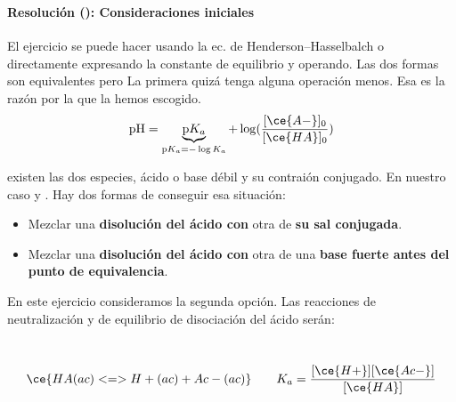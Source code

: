 \begin{frame}
	\frametitle{\ejerciciocmd}
	\framesubtitle{Resolución (): Consideraciones iniciales}
	El ejercicio se puede hacer usando la ec. de Henderson--Hasselbalch o directamente expresando la constante de equilibrio y operando. Las dos formas son equivalentes pero La primera quizá tenga alguna operación menos. Esa es la razón por la que la hemos escogido.
	$$
		\text{pH} = \underbrace{\text{p}K_a}_{\text{p}K_a = -\log K_a} + \log(\frac{[\ce{A-}]_0}{[\ce{HA}]_0})
	$$
	
	 existen las dos especies, ácido o base débil y su contraión conjugado. En nuestro caso  y . Hay dos formas de conseguir esa situación:
	\begin{itemize}
		\item Mezclar una \textbf{disolución del ácido con} otra de \textbf{su sal conjugada}.
		\item Mezclar una \textbf{disolución del ácido con} otra de una \textbf{base fuerte antes del punto de equivalencia}.
	\end{itemize}
	En este ejercicio consideramos la segunda opción. Las reacciones de neutralización y de equilibrio de disociación del ácido serán:
	\begin{center}
		\\
		$$
			\ce{HA(ac) <=> H+(ac) + Ac-(ac)}\qquad K_a=\frac{[\ce{H+}][\ce{Ac-}]}{[\ce{HA}]}
		$$
	\end{center}
\end{frame}

